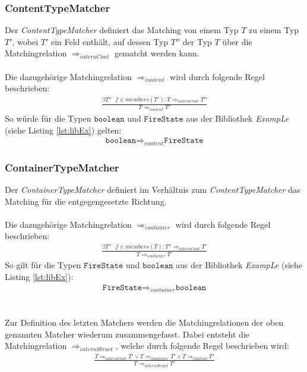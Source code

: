 \subsubsection{ContentTypeMatcher}
Der \emph{ContentTypeMatcher} definiert das Matching von einem Typ $T$ zu einem Typ $T'$, wobei $T'$ ein Feld enthält, auf dessen Typ $T''$ der Typ $T$ über die Matchingrelation $\Rightarrow_{internCont}$ gematcht werden kann.
\\\\
Die dazugehörige Matchingrelation $\Rightarrow_{content}$ wird durch folgende Regel beschrieben:
\begin{gather*}
\frac{\exists \mathit{T''\text{ }f}\in members(T'): T \Rightarrow_{internCont} T''}{T \Rightarrow_{content} T'}
\end{gather*}
\noindent
So würde für die Typen $\texttt{boolean}$ und $\texttt{FireState}$ aus der Bibliothek \emph{ExampLe} (siehe Listing \ref{lst:libEx}) gelten: 
\begin{gather*}
\texttt{boolean} \Rightarrow_{content} \texttt{FireState}
\end{gather*}
\subsubsection{ContainerTypeMatcher}
Der \emph{ContainerTypeMatcher} definiert im Verhältnis zum \emph{ContentTypeMatcher} das Matching für die entgegengesetzte Richtung.
\\\\
Die dazugehörige Matchingrelation $\Rightarrow_{container}$ wird durch folgende Regel beschrieben:
\begin{gather*}
\frac{\exists \mathit{T''\text{ }f}\in members(T): T'' \Rightarrow_{internCont} T'}{T \Rightarrow_{container} T'}
\end{gather*}
\noindent
So gilt für die Typen $\texttt{FireState}$ und $\texttt{boolean}$ aus der Bibliothek \emph{ExampLe} (siehe Listing \ref{lst:libEx}): 
\begin{gather*}
\texttt{FireState} \Rightarrow_{container} \texttt{boolean}
\end{gather*}
\\\\
Zur Definition des letzten Matchers werden die Matchingrelationen der oben genannten Matcher wiederum zusammengefasst. Dabei entsteht die Matchingrelation $\Rightarrow_{internStruct}$, welche durch folgende Regel beschrieben wird:
\begin{gather*}
\frac{T \Rightarrow_{internCont}T' \vee T \Rightarrow_{container} T' \vee T \Rightarrow_{content} T'}{T \Rightarrow_{internStruct}T'}
\end{gather*}
\\\\
